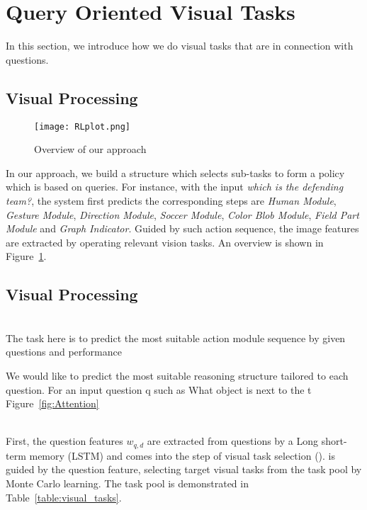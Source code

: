 \section{Query Oriented Visual Tasks}
\label{sec-reinforcement-learning}
In this section, we introduce how we do visual tasks that are in connection with questions. 


\subsection{Visual Processing}
\label{sec-visual-processing}
\begin{figure}[h]
\begin{center}
\texttt{[image: RLplot.png]}
\end{center}
\caption{Overview of our approach}
\label{fig:RLplot}
\end{figure}

In our approach, we build a structure which selects sub-tasks to form a policy which is based on queries. For instance, with the input \textit{which is the defending team?}, the system first predicts the corresponding steps are \textit{Human Module}, \textit{Gesture Module}, \textit{Direction Module}, \textit{Soccer Module}, \textit{Color Blob Module}, \textit{Field Part Module} and \textit{Graph Indicator}. Guided by such action sequence, the image features are extracted by operating relevant vision tasks. An overview is shown in Figure~\ref{fig:RLplot}.

\subsection{Visual Processing}
\label{sec-visual-processing}

\\
The task here is to predict the most suitable action module sequence by given questions and performance

We would like to predict the most suitable reasoning
structure tailored to each question. For an input question q
such as What object is next to the t
Figure~\ref{fig:Attention}





\\
First, the question features $w_{q,d}$ are extracted from questions by a Long short-term memory (LSTM) and comes into the step of visual task selection ().  is guided by the question feature, selecting target visual tasks from the task pool by Monte Carlo learning. The task pool is demonstrated in Table~\ref{table:visual_tasks}.



